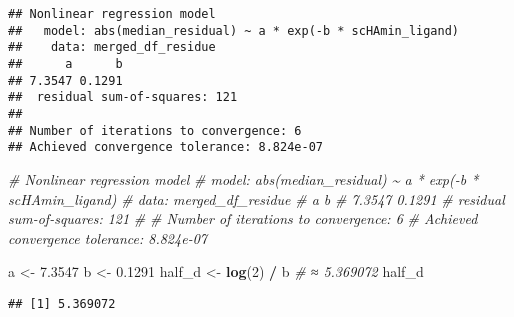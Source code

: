 \documentclass[
]{article}
\newenvironment{Shaded}{\begin{snugshade}}{\end{snugshade}}
\newcommand{\AttributeTok}[1]{\textcolor[rgb]{0.13,0.29,0.53}{#1}}
\newcommand{\CommentTok}[1]{\textcolor[rgb]{0.56,0.35,0.01}{\textit{#1}}}
\newcommand{\ConstantTok}[1]{\textcolor[rgb]{0.56,0.35,0.01}{#1}}
\newcommand{\DecValTok}[1]{\textcolor[rgb]{0.00,0.00,0.81}{#1}}
\newcommand{\FloatTok}[1]{\textcolor[rgb]{0.00,0.00,0.81}{#1}}
\newcommand{\FunctionTok}[1]{\textcolor[rgb]{0.13,0.29,0.53}{\textbf{#1}}}
\newcommand{\NormalTok}[1]{#1}
\newcommand{\OtherTok}[1]{\textcolor[rgb]{0.56,0.35,0.01}{#1}}
\newcommand{\SpecialCharTok}[1]{\textcolor[rgb]{0.81,0.36,0.00}{\textbf{#1}}}
\newcommand{\StringTok}[1]{\textcolor[rgb]{0.31,0.60,0.02}{#1}}
\begin{document}
\begin{verbatim}
## Nonlinear regression model
##   model: abs(median_residual) ~ a * exp(-b * scHAmin_ligand)
##    data: merged_df_residue
##      a      b 
## 7.3547 0.1291 
##  residual sum-of-squares: 121
## 
## Number of iterations to convergence: 6 
## Achieved convergence tolerance: 8.824e-07
\end{verbatim}

\begin{Shaded}
\begin{Highlighting}[]
\CommentTok{\# Nonlinear regression model}
\CommentTok{\#   model: abs(median\_residual) \textasciitilde{} a * exp({-}b * scHAmin\_ligand)}
\CommentTok{\#    data: merged\_df\_residue}
\CommentTok{\#      a      b }
\CommentTok{\# 7.3547 0.1291 }
\CommentTok{\#  residual sum{-}of{-}squares: 121}
\CommentTok{\# }
\CommentTok{\# Number of iterations to convergence: 6 }
\CommentTok{\# Achieved convergence tolerance: 8.824e{-}07}

\NormalTok{a }\OtherTok{\textless{}{-}} \FloatTok{7.3547}
\NormalTok{b }\OtherTok{\textless{}{-}}  \FloatTok{0.1291}
\NormalTok{half\_d }\OtherTok{\textless{}{-}} \FunctionTok{log}\NormalTok{(}\DecValTok{2}\NormalTok{) }\SpecialCharTok{/}\NormalTok{ b  }\CommentTok{\# ≈ 5.369072}
\NormalTok{half\_d}
\end{Highlighting}
\end{Shaded}

\begin{verbatim}
## [1] 5.369072
\end{verbatim}

\begin{Shaded}
\end{Shaded}
\end{document}
